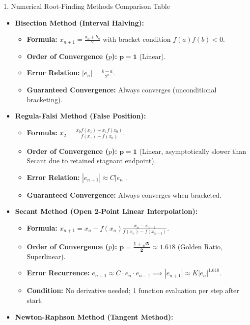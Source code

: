 \documentclass[11pt,a4paper]{article}
\begin{document}
\begin{formulabox}{1. Numerical Root-Finding Methods Comparison Table}
\begin{itemize}
    \item \textbf{Bisection Method (Interval Halving):}
    \begin{itemize}
        \item \textbf{Formula:} $x_{n+1} = \frac{a_n + b_n}{2}$ with bracket condition $f(a)f(b) < 0$.
        \item \textbf{Order of Convergence ($p$):} $\mathbf{p = 1}$ (Linear).
        \item \textbf{Error Relation:} $|e_n| = \frac{b - a}{2^n}$.
        \item \textbf{Guaranteed Convergence:} Always converges (unconditional bracketing).
    \end{itemize}
    \item \textbf{Regula-Falsi Method (False Position):}
    \begin{itemize}
        \item \textbf{Formula:} $x_2 = \frac{x_0 f(x_1) - x_1 f(x_0)}{f(x_1) - f(x_0)}$.
        \item \textbf{Order of Convergence ($p$):} $\mathbf{p = 1}$ (Linear, asymptotically slower than Secant due to retained stagnant endpoint).
        \item \textbf{Error Relation:} $|e_{n+1}| \approx C |e_n|$.
        \item \textbf{Guaranteed Convergence:} Always converges when bracketed.
    \end{itemize}
    \item \textbf{Secant Method (Open 2-Point Linear Interpolation):}
    \begin{itemize}
        \item \textbf{Formula:} $x_{n+1} = x_n - f(x_n)\frac{x_n - x_{n-1}}{f(x_n) - f(x_{n-1})}$.
        \item \textbf{Order of Convergence ($p$):} $\mathbf{p = \frac{1 + \sqrt{5}}{2} \approx 1.618}$ (Golden Ratio, Superlinear).
        \item \textbf{Error Recurrence:} $e_{n+1} \approx C \cdot e_n \cdot e_{n-1} \implies |e_{n+1}| \approx K |e_n|^{1.618}$.
        \item \textbf{Condition:} No derivative needed; 1 function evaluation per step after start.
    \end{itemize}
    \item \textbf{Newton-Raphson Method (Tangent Method):}
    \begin{itemize}

\end{itemize}
\end{itemize}
\end{formulabox}
\end{document}
